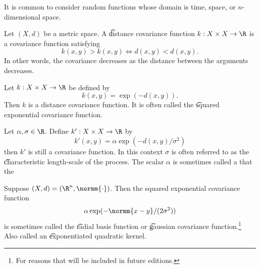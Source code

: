 

It is common to consider random functions whose domain is time, space, or $n$-dimensional space.


Let $(X, d)$ be a metric space.  A \t{distance covariance function} $k: X \times X \to \R$ is a covariance function satisfying
\[
  k(x, y) > k(x, y) \iff d(x, y) < d(x, y).
\]
In other words, the covariance decreases as the distance between the arguments decreases.


Let $k: X \times X \to \R$ be defined by
\[
  k(x, y) = \exp(-d(x, y)).
\]
Then $k$ is a distance covariance function.
It is often called the \t{squared exponential covariance function}.

Let $\alpha, \sigma \in \R$.
Define $k': X \times X \to \R$ by
\[
  k'(x, y) = \alpha\exp(-d(x, y)/\sigma^2)
\]
then $k'$ is still a covariance function.
In this context $\sigma$ is often referred to as the \t{characteristic length-scale} of the process.
The scalar $\alpha$ is sometimes called a  that  the 

Suppose $(X, d) = (\R^n, \normm{\cdot})$.
Then the squared exponential covariance function
\[
 \alpha\exp(-\normm{x - y}/(2\sigma^2))
\]
is sometimes called the \t{radial basis function} or \t{gaussian covariance function}.\footnote{For reasons that will be included in future editions.}
Also called an \t{exponentiated quadratic kernel}.
